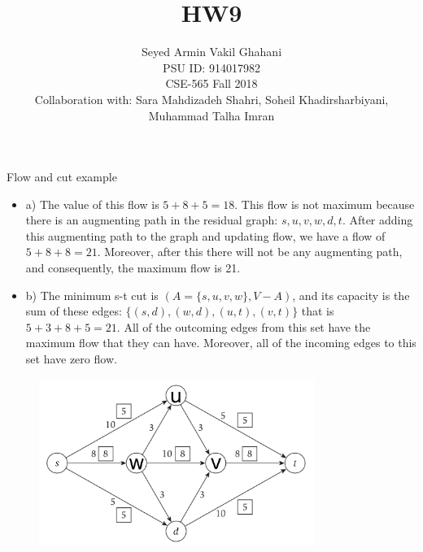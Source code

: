 \documentclass[12pt]{article}
\newenvironment{solution}[2][Solution]{\begin{trivlist}
\item[\hskip \labelsep {\bfseries #1}]}{\end{trivlist}}
\newenvironment{problem}[2][Problem]{\begin{trivlist}
\item[\hskip \labelsep {\bfseries #1}\hskip \labelsep {\bfseries #2.}]}{\end{trivlist}}
\begin{document}
 
\title{\textbf{HW9}}%
\author{Seyed Armin Vakil Ghahani\\ %
PSU ID: 914017982\\
CSE-565 Fall 2018\\
Collaboration with:
Sara Mahdizadeh Shahri, Soheil Khadirsharbiyani,\\
Muhammad Talha Imran} %
 
\maketitle
\begin{problem}{1}
Flow and cut example
\end{problem}

\begin{solution}{}
\begin{itemize}
\item a) The value of this flow is $5+8+5 = 18$. This flow is not maximum 
because there is an augmenting path in the residual graph: $s, u, v, w, d, t$.
After adding this augmenting path to the graph and updating flow, we have a
flow of $5+8+8=21$. Moreover, after this there will not be any augmenting
path, and consequently, the maximum flow is 21.
\item b) The minimum s-t cut is $(A=\{s, u, v, w\}, V-A)$, and its capacity is
the sum of these edges: $\{(s,d), (w,d), (u,t), (v,t)\}$ that is $5+3+8+5=21$. All of the outcoming edges from this set have the maximum
flow that they can have. Moreover, all of the incoming edges to this set
have zero flow.
\end{itemize}
\begin{figure}[H]
 \centering
 \includegraphics[width=0.80\textwidth]{q1.png}
 \caption{
 \label{fig:1a}}
\end{figure}
\end{solution}
\end{document}

